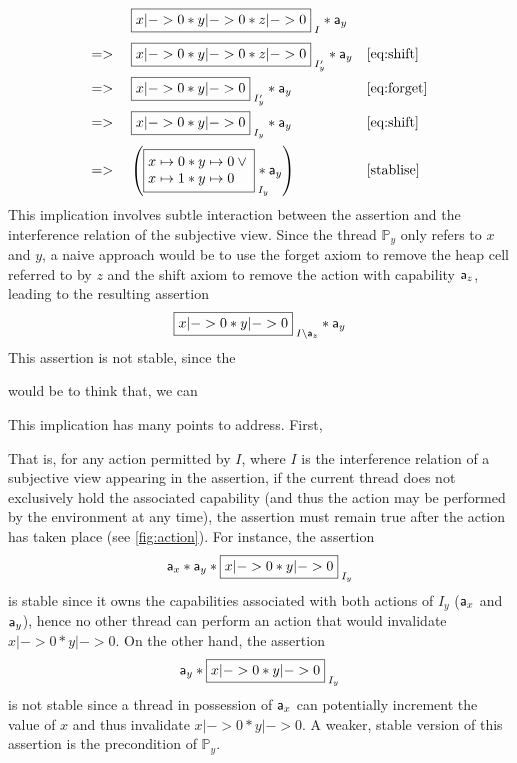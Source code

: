 \[
\begin{array}{lll}
 & \shared{x|-> 0 * y|->0 * z|-> 0}{I} *\token a_y&\\[1em]
=> & \shared{x|-> 0 * y|->0 * z|-> 0}{I'_y} *\token a_y &\eqref{eq:shift}\\[1em]
 => & \shared{x|-> 0 * y|->0 }{I'_y} *\token a_y
 &\eqref{eq:forget}\\[1em]
=> & \shared{x|-> 0 * y|->0 }{I_y} *\token a_y
 &\eqref{eq:shift}\\[1em]
 =>\null&
    \left(\shared{\begin{array}{@{}l<{\null}@{}l<{\null}@{}}\cell{x}{0} *
        \cell{y}{0} \lor\\ \cell{x}{1} *
        \cell{y}{0}\end{array}}{I_y}\!\!\!\!\!\! * \token a_y\right) &\eqref{stablise}
\end{array}
\]
This implication involves subtle interaction between the assertion and
the interference relation of the subjective view. Since the thread $\mathbb{P}_y$ only refers to
$x$ and $y$,  a  naive approach would be to use the  forget axiom to remove
the heap cell referred to by $z$ and the shift axiom to remove the
action with capability $\mathsf{a}_z$, leading to the resulting
assertion 
\[
 \shared{x|-> 0 * y|->0 }{I\backslash \token a_z } *\token a_y
\]
This assertion is not stable, since the 


would be to think that, we can 



This implication has many points to address. First, 





That is, for any action permitted by $I$, where $I$ is
the interference relation of a subjective view appearing in the
assertion, if the current thread does not exclusively hold the
associated capability (and thus the action may be performed by the
environment at any time), the assertion must remain true after the
action has taken place (see \fig\ref{fig:action}). For instance, the
assertion
\[
\token a_x * \token a_y * \shared{x|->0 * y|->0}{I_y}
\]
is stable since it owns the capabilities associated with both actions
of $I_y$ ($\mathsf{a}_x$ and $\mathsf{a}_y$), hence no other thread can
perform an action that would invalidate $x|->0 * y|->0$. On the other
hand, the assertion
\[
\token a_y * \shared{x|->0 * y|->0}{I_y}
\]
is not stable since a thread in possession of $\mathsf{a}_x$ can
potentially increment the value of $x$ and thus invalidate $x|->0 *
y|->0$. A weaker, stable version of this assertion is the precondition
of $\mathbb P_y$.



